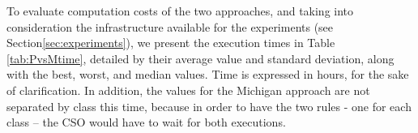 \documentclass[runningheads]{llncs}
\begin{document}
To evaluate computation costs of the two approaches, and taking into consideration the infrastructure available for the experiments (see Section\ref{sec:experiments}), we present the execution times in Table \ref{tab:PvsMtime}, detailed by their average value and standard deviation, along with the best, worst, and median values. Time is expressed in hours, for the sake of clarification. In addition, the values for the Michigan approach are not separated by class this time, because in order to have the two rules - one for each class -- the CSO would have to wait for both executions.
%
\begin{table}[h!tbp]
	\centering
	\caption{Execution time, Pittsburgh and Michigan approaches;
          this one adds times for GRANTED and STRONGDENY. \textbf{$*$} marks  statistically significant best values.}
\end{table}
\end{document}
